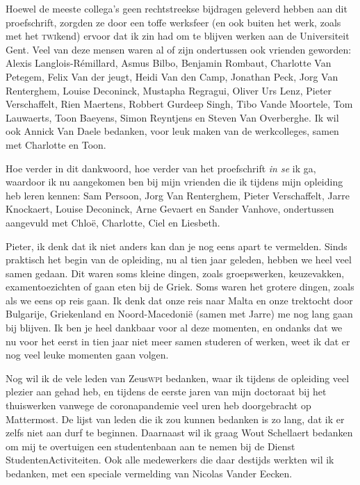 \documentclass[main]{subfiles}
\begin{document}
Hoewel de meeste collega's geen rechtstreekse bijdragen geleverd hebben aan dit proefschrift, zorgden ze door een toffe werksfeer (en ook buiten het werk, zoals met het \textsc{twi}kend) ervoor dat ik zin had om te blijven werken aan de Universiteit Gent.
Veel van deze mensen waren al of zijn ondertussen ook vrienden geworden: Alexis Langlois-Rémillard, Asmus Bilbo, Benjamin Rombaut, Charlotte Van Petegem, Felix Van der jeugt, Heidi Van den Camp, Jonathan Peck, Jorg Van Renterghem, Louise Deconinck, Mustapha Regragui, Oliver Urs Lenz, Pieter Verschaffelt, Rien Maertens, Robbert Gurdeep Singh, Tibo Vande Moortele, Tom Lauwaerts, Toon Baeyens, Simon Reyntjens en Steven Van Overberghe.
Ik wil ook Annick Van Daele bedanken, voor leuk maken van de werkcolleges, samen met Charlotte en Toon.

Hoe verder in dit dankwoord, hoe verder van het proefschrift \textit{in se} ik ga, waardoor ik nu aangekomen ben bij mijn vrienden die ik tijdens mijn opleiding heb leren kennen: Sam Persoon, Jorg Van Renterghem, Pieter Verschaffelt, Jarre Knockaert, Louise Deconinck, Arne Gevaert en Sander Vanhove, ondertussen aangevuld met Chloë, Charlotte, Ciel en Liesbeth.

Pieter, ik denk dat ik niet anders kan dan je nog eens apart te vermelden.
Sinds praktisch het begin van de opleiding, nu al tien jaar geleden, hebben we heel veel samen gedaan.
Dit waren soms kleine dingen, zoals groepswerken, keuzevakken, examentoezichten of gaan eten bij de Griek.
Soms waren het grotere dingen, zoals als we eens op reis gaan.
Ik denk dat onze reis naar Malta en onze trektocht door Bulgarije, Griekenland en Noord-Macedonië (samen met Jarre) me nog lang gaan bij blijven.
Ik ben je heel dankbaar voor al deze momenten, en ondanks dat we nu voor het eerst in tien jaar niet meer samen studeren of werken, weet ik dat er nog veel leuke momenten gaan volgen.

Nog wil ik de vele leden van Zeus\textsc{wpi} bedanken, waar ik tijdens de opleiding veel plezier aan gehad heb, en tijdens de eerste jaren van mijn doctoraat bij het thuiswerken vanwege de coronapandemie veel uren heb doorgebracht op Mattermost.
De lijst van leden die ik zou kunnen bedanken is zo lang, dat ik er zelfs niet aan durf te beginnen.
Daarnaast wil ik graag Wout Schellaert bedanken om mij te overtuigen een studentenbaan aan te nemen bij de Dienst StudentenActiviteiten.
Ook alle medewerkers die daar destijds werkten wil ik bedanken, met een speciale vermelding van Nicolas Vander Eecken.
\end{document}
